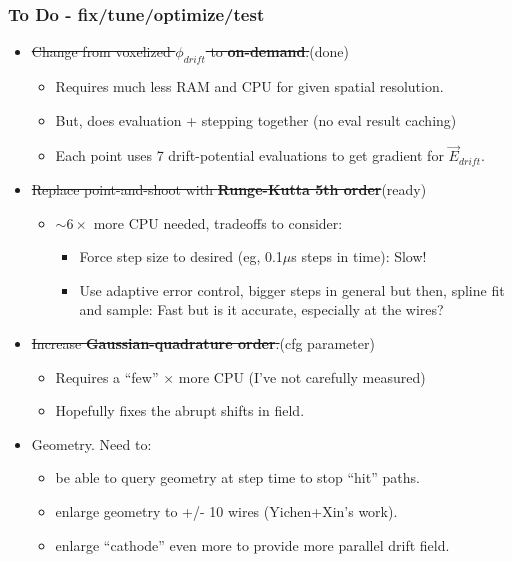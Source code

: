 \documentclass[xcolor=dvipsnames]{beamer}
\begin{document}
\begin{frame}
  \frametitle{To Do - fix/tune/optimize/test}
  \begin{itemize}
  \item \sout{Change from voxelized $\phi_{drift}$ to \textbf{on-demand}.}(done)
    \begin{itemize}\footnotesize
    \item Requires much less RAM and CPU for given spatial resolution.
    \item But, does evaluation + stepping together (no eval result
      caching)
    \item Each point uses 7 drift-potential evaluations to get gradient for $\vec{E}_{drift}$.
    \end{itemize}
  \item \sout{Replace point-and-shoot with \textbf{Runge-Kutta 5th order}}(ready)
    \begin{itemize}\footnotesize
    \item $\sim 6\times$ more CPU needed, tradeoffs to consider:
      \begin{itemize}\scriptsize
      \item Force step size to desired (eg, 0.1$\mu$s steps in time): Slow!
      \item Use adaptive error control, bigger steps in general but
        then, spline fit and sample: Fast but is it accurate,
        especially at the wires?
      \end{itemize}
    \end{itemize}
  \item \sout{Increase \textbf{Gaussian-quadrature order}.}(cfg parameter)
    \begin{itemize}\footnotesize
    \item Requires a ``few'' $\times$ more CPU (I've not carefully measured)
    \item Hopefully fixes the abrupt shifts in field.
    \end{itemize}
  \item Geometry.  Need to:
    \begin{itemize}\footnotesize
    \item be able to query geometry at step time to stop ``hit'' paths.
    \item enlarge geometry to +/- 10 wires (Yichen+Xin's work).
    \item enlarge ``cathode'' even more to provide more parallel drift field.
    \end{itemize}
  \end{itemize}
\end{frame}
\end{document}
